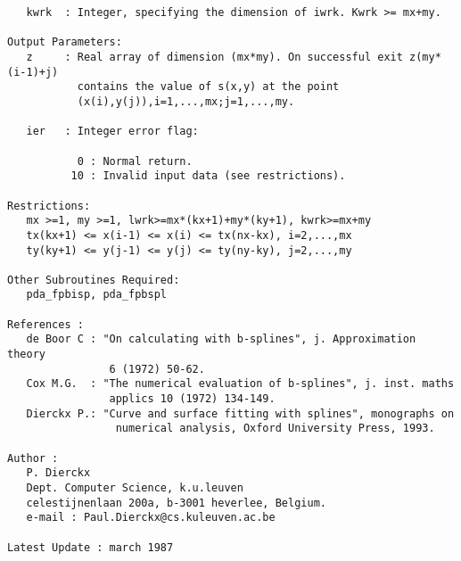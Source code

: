 \begin{verbatim}
   kwrk  : Integer, specifying the dimension of iwrk. Kwrk >= mx+my.

Output Parameters:
   z     : Real array of dimension (mx*my). On successful exit z(my*(i-1)+j) 
           contains the value of s(x,y) at the point 
           (x(i),y(j)),i=1,...,mx;j=1,...,my.

   ier   : Integer error flag:

           0 : Normal return.
          10 : Invalid input data (see restrictions).

Restrictions:
   mx >=1, my >=1, lwrk>=mx*(kx+1)+my*(ky+1), kwrk>=mx+my
   tx(kx+1) <= x(i-1) <= x(i) <= tx(nx-kx), i=2,...,mx
   ty(ky+1) <= y(j-1) <= y(j) <= ty(ny-ky), j=2,...,my

Other Subroutines Required:
   pda_fpbisp, pda_fpbspl

References :
   de Boor C : "On calculating with b-splines", j. Approximation theory
                6 (1972) 50-62.
   Cox M.G.  : "The numerical evaluation of b-splines", j. inst. maths
                applics 10 (1972) 134-149.
   Dierckx P.: "Curve and surface fitting with splines", monographs on
                 numerical analysis, Oxford University Press, 1993.

Author :
   P. Dierckx
   Dept. Computer Science, k.u.leuven
   celestijnenlaan 200a, b-3001 heverlee, Belgium.
   e-mail : Paul.Dierckx@cs.kuleuven.ac.be

Latest Update : march 1987

\end{verbatim}


